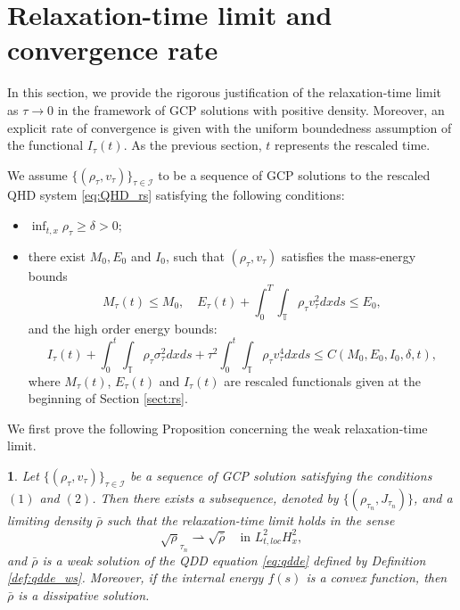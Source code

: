 \documentclass[leqno]{amsart}
\theoremstyle{plain}
\theoremstyle{definition}
\theoremstyle{remark}
\theoremstyle{plain}
\theoremstyle{plain}
\newtheorem{prop}[thm]{\protect\propositionname}
\providecommand{\propositionname}{Proposition}
\def\T{{\mathbb T}}%
\numberwithin{equation}{section}
\begin{document}
\section{Relaxation-time limit and convergence rate}\label{sect:rxl}

In this section, we provide the rigorous justification of the relaxation-time limit as $\tau\to 0$ in the framework of GCP solutions with positive density. Moreover, an explicit rate of convergence is given with the uniform boundedness assumption of the functional $I_\tau(t)$. As the previous section, $t$ represents the rescaled time.

We assume $\{(\rho_\tau,v_\tau)\}_{\tau\in\mathcal{I}}$ to be a sequence of GCP solutions to the rescaled QHD system \eqref{eq:QHD_rs} satisfying the following conditions:
\begin{itemize}
\item[(1)] $\inf_{t,x}\rho_\tau\geq \delta>0$;
\item[(2)] there exist $M_0,E_0$ and $I_0$, such that $(\rho_\tau,v_\tau)$ satisfies the mass-energy bounds
\begin{equation}\label{eq:bd_me_rxl}
M_\tau(t)\leq  M_0,\quad E_\tau(t)+\int_0^T\int_\T \rho_\tau v_\tau^2dxds\leq E_0,
\end{equation}
and the high order energy bounds:
\begin{equation}\label{eq:bd_I_rxl}
I_\tau(t)+\int_0^t\int_\T \rho_\tau\sigma_\tau^2 dxds+\tau^2\int_0^t\int_\T \rho_\tau v_\tau^4 dxds\leq C(M_0,E_0,I_0,\delta,t),
\end{equation}
where $M_\tau(t)$, $E_\tau(t)$ and $I_\tau(t)$ are rescaled functionals given at the beginning of Section \ref{sect:rs}.
\end{itemize}

We first prove the following Proposition concerning the weak relaxation-time limit.

\begin{prop}
Let $\{(\rho_\tau,v_\tau)\}_{\tau\in\mathcal{I}}$ be a sequence of GCP solution satisfying the conditions $(1)$ and $(2)$. Then there exists a subsequence, denoted by $\{(\rho_{\tau_n},J_{\tau_n})\}$, and a limiting density $\bar\rho$ such that the relaxation-time limit holds in the sense
\[
\sqrt\rho_{\tau_n}\rightharpoonup\sqrt{\bar\rho}\quad\textrm{in }L^2_{t,loc}H^2_x,
\]
and $\bar\rho$ is a weak solution of the QDD equation \eqref{eq:qdde} defined by Definition \ref{def:qdde_ws}. Moreover, if the internal energy $f(s)$ is a convex function, then $\bar\rho$ is a dissipative solution.
\end{prop}
\end{document}
